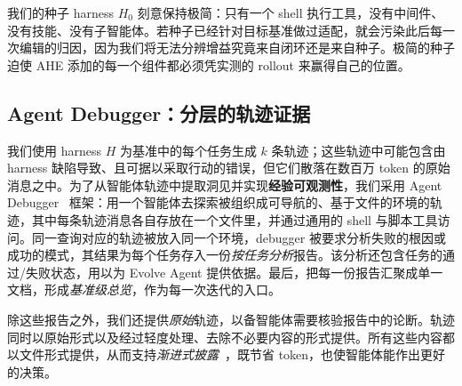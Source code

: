 我们的种子 harness $H_0$ 刻意保持极简：只有一个 shell 执行工具，没有中间件、没有技能、没有子智能体。若种子已经针对目标基准做过适配，就会污染此后每一次编辑的归因，因为我们将无法分辨增益究竟来自闭环还是来自种子。极简的种子迫使 AHE 添加的每一个组件都必须凭实测的 rollout 来赢得自己的位置。


\subsection{Agent Debugger：分层的轨迹证据}
\label{sec:method:adb}

我们使用 harness $H$ 为基准中的每个任务生成 $k$ 条轨迹；这些轨迹中可能包含由 harness 缺陷导致、且可据以采取行动的错误，但它们散落在数百万 token 的原始消息之中。为了从智能体轨迹中提取洞见并实现\textbf{经验可观测性}，我们采用 Agent Debugger~\citep{linAgentDebuggerUnderstanding2026} 框架：用一个智能体去探索被组织成可导航的、基于文件的环境的轨迹，其中每条轨迹消息各自存放在一个文件里，并通过通用的 shell 与脚本工具访问。同一查询对应的轨迹被放入同一个环境，debugger 被要求分析失败的根因或成功的模式，其结果为每个任务存入一份\emph{按任务分析}报告。该分析还包含任务的通过/失败状态，用以为 Evolve Agent 提供依据。最后，把每一份报告汇聚成单一文档，形成\emph{基准级总览}，作为每一次迭代的入口。

除这些报告之外，我们还提供\emph{原始}轨迹，以备智能体需要核验报告中的论断。轨迹同时以原始形式以及经过轻度处理、去除不必要内容的形式提供。所有这些内容都以文件形式提供，从而支持\textit{渐进式披露}~\citep{EffectiveContextEngineering}，既节省 token，也使智能体能作出更好的决策。




